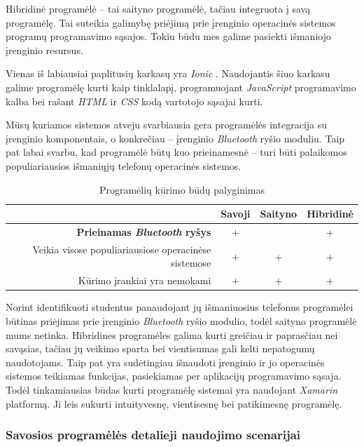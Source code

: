 \documentclass{VUMIFPSkursinis}
\begin{document}

Hibridinė programėlė – tai saityno programėlė, tačiau integruota į 	savą programėlę. Tai suteikia galimybę priėjimą prie įrenginio operacinės sistemos programų programavimo sąsajos. Tokiu būdu mes galime pasiekti išmaniojo įrenginio resursus.

Vienas iš labiausiai paplitusių karkasų yra \textit{Ionic} \cite{hybridFrameworks}. Naudojantis šiuo karkasu galime programėlę kurti kaip tinklalapį, programuojant \textit{JavaScript} programavimo kalba bei rašant \textit{HTML} ir \textit{CSS} kodą vartotojo sąsajai kurti.


Mūsų kuriamos sistemos atveju svarbiausia gera programėlės integracija su įrenginio komponentais, o konkrečiau – įrenginio \textit{Bluetooth} ryšio moduliu. Taip pat labai svarbu, kad programėlė būtų kuo prieinamesnė – turi būti palaikomos populiariausios išmaniųjų telefonų operacinės sistemos.

\begin{table}[H]
	\centering
	\begin{tabular}{ | r | c | c | c | }
		\hline
		& Savoji & Saityno & Hibridinė \\
		\hline
		\textbf{Prieinamas \textit{Bluetooth} ryšys} & + &  & + \\
		\hline
		Veikia visose populiariausiose operacinėse sistemose & + & + & + \\
		\hline
		Kūrimo įrankiai yra nemokami & + & + & + \\
		\hline
	\end{tabular}
	\caption{Programėlių kūrimo būdų palyginimas}
	\label{appCompare}
\end{table}

Norint identifikuoti studentus panaudojant jų išmaniuosius telefonus programėlei būtinas priėjimas prie įrenginio \textit{Bluetooth} ryšio modulio, todėl saityno programėlė mums netinka. Hibridines programėles galima kurti greičiau ir paprasčiau nei savąsias, tačiau jų veikimo sparta bei vientisumas gali kelti nepatogumų naudotojams. Taip pat yra sudėtingiau išnaudoti įrenginio ir jo operacinės sistemos teikiamas funkcijas, pasiekiamas per aplikacijų programavimo sąsaja. Todėl tinkamiausias būdas kurti programėlę sistemai yra naudojant \textit{Xamarin} platformą. Ji leis sukurti intuityvesnę, vientisesnę bei patikimesnę programėlę.

\subsubsection{Savosios programėlės detalieji naudojimo scenarijai}
\end{document}
